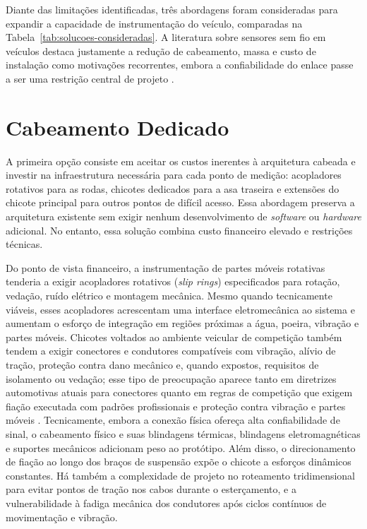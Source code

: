 Diante das limitações identificadas, três abordagens foram consideradas para
expandir a capacidade de instrumentação do veículo, comparadas na Tabela~\ref{tab:solucoes-consideradas}.
A literatura sobre sensores sem fio em veículos destaca justamente a redução de
cabeamento, massa e custo de instalação como motivações recorrentes, embora a
confiabilidade do enlace passe a ser uma restrição central de projeto
\cite{tavares2008_wsn_automobiles,rahman2017_intravehicular_wsn,hashemi2014_intracar_multihop_wsn}.

\section{Cabeamento Dedicado}

A primeira opção consiste em aceitar os custos inerentes à arquitetura cabeada e investir na infraestrutura necessária para cada ponto de medição: acopladores rotativos para as rodas, chicotes dedicados para a asa traseira e extensões do chicote principal para outros pontos de difícil acesso. Essa abordagem preserva a arquitetura existente sem exigir nenhum desenvolvimento de \emph{software} ou \emph{hardware} adicional. No entanto, essa solução combina custo financeiro elevado e restrições técnicas.

Do ponto de vista financeiro, a instrumentação de partes móveis rotativas tenderia a exigir acopladores rotativos (\emph{slip rings}) especificados para rotação, vedação, ruído elétrico e montagem mecânica. Mesmo quando tecnicamente viáveis, esses acopladores acrescentam uma interface eletromecânica ao sistema e aumentam o esforço de integração em regiões próximas a água, poeira, vibração e partes móveis. Chicotes voltados ao ambiente veicular de competição também tendem a exigir conectores e condutores compatíveis com vibração, alívio de tração, proteção contra dano mecânico e, quando expostos, requisitos de isolamento ou vedação; esse tipo de preocupação aparece tanto em diretrizes automotivas atuais para conectores quanto em regras de competição que exigem fiação executada com padrões profissionais e proteção contra vibração e partes móveis \cite{blatt2020_aquisicao_formula_sae,sae_uscar12_2021}. Tecnicamente, embora a conexão física ofereça alta confiabilidade de sinal, o cabeamento físico e suas blindagens térmicas, blindagens eletromagnéticas e suportes mecânicos adicionam peso ao protótipo. Além disso, o direcionamento de fiação ao longo dos braços de suspensão expõe o chicote a esforços dinâmicos constantes. Há também a complexidade de projeto no roteamento tridimensional para evitar pontos de tração nos cabos durante o esterçamento, e a vulnerabilidade à fadiga mecânica dos condutores após ciclos contínuos de movimentação e vibração.

